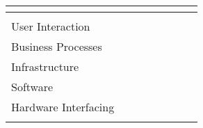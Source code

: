 {	\newcommand{\SManage}[0]{}
	\newcommand{\SAnalyse}[0]{}
	\newcommand{\SAdvise}[0]{}
	\newcommand{\SDesign}[0]{}
	\newcommand{\SImplement}[0]{}
	\newcommand{\Software}[1]{
		\renewcommand{\Manage}[1]{\renewcommand{\SManage}[0]{####1}}
		\renewcommand{\Analyse}[1]{\renewcommand{\SAnalyse}[0]{####1}}
		\renewcommand{\Advise}[1]{\renewcommand{\SAdvise}[0]{####1}}
		\renewcommand{\Design}[1]{\renewcommand{\SDesign}[0]{####1}}
		\renewcommand{\Implement}[1]{\renewcommand{\SImplement}[0]{####1}}
		##1
	}

	\newcommand{\HIManage}[0]{}
	\newcommand{\HIAnalyse}[0]{}
	\newcommand{\HIAdvise}[0]{}
	\newcommand{\HIDesign}[0]{}
	\newcommand{\HIImplement}[0]{}
	\newcommand{\HardwareInterfacing}[1]{
		\renewcommand{\Manage}[1]{\renewcommand{\HIManage}[0]{####1}}
		\renewcommand{\Analyse}[1]{\renewcommand{\HIAnalyse}[0]{####1}}
		\renewcommand{\Advise}[1]{\renewcommand{\HIAdvise}[0]{####1}}
		\renewcommand{\Design}[1]{\renewcommand{\HIDesign}[0]{####1}}
		\renewcommand{\Implement}[1]{\renewcommand{\HIImplement}[0]{####1}}
		##1
	}

}{
	\begin{table}[H]
		\begin{tabularx}{\textwidth}{|l|Y|Y|Y|Y|Y||Y|Y|}
			\hline
			 \\ \hline
			&  &  &  &  &  &  &  \\ \hline
			User Interaction & \UIManage & \UIAnalyse & \UIAdvise & \UIDesign & \UIImplement & \grey & \grey \\ \hline
			Business Processes & \BPManage & \BPAnalyse & \BPAdvise & \BPDesign & \BPImplement & \grey & \grey \\ \hline
			Infrastructure & \IManage & \IAnalyse & \IAdvise & \IDesign & \IImplement & \grey & \grey \\ \hline
			Software & \SManage & \SAnalyse & \SAdvise & \SDesign & \SImplement & \grey & \grey \\ \hline
			Hardware Interfacing & \HIManage & \HIAnalyse & \HIAdvise & \HIDesign & \HIImplement & \grey & \grey \\ \hline
			 & \BehaviorValue & \ResearchValue \\ \hline
		\end{tabularx}
	\end{table}
	\nospace
}

